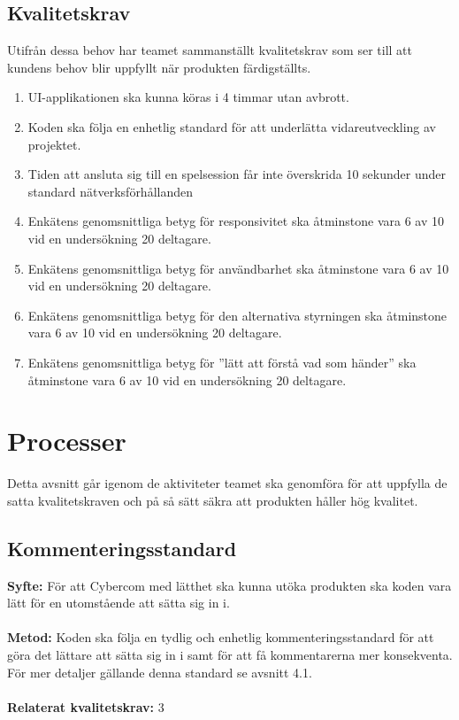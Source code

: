 \documentclass[10pt]{article}
\begin{document}
	\subsection{Kvalitetskrav}
	Utifrån dessa behov har teamet sammanställt kvalitetskrav som ser till att kundens behov blir uppfyllt när produkten färdigställts.
	\begin{enumerate}
		\item UI-applikationen ska kunna köras i 4 timmar utan avbrott.
		\item Koden ska följa en enhetlig standard för att underlätta vidareutveckling av projektet.
		\item Tiden att ansluta sig till en spelsession får inte överskrida 10 sekunder under standard nätverksförhållanden
		\item Enkätens genomsnittliga betyg för responsivitet ska åtminstone vara 6 av 10 vid en undersökning 20 deltagare.
		\item Enkätens genomsnittliga betyg för användbarhet ska åtminstone vara 6 av 10 vid en undersökning 20 deltagare.
		\item Enkätens genomsnittliga betyg för den alternativa styrningen ska åtminstone vara 6 av 10 vid en undersökning 20 deltagare.
		\item Enkätens genomsnittliga betyg för ''lätt att förstå vad som händer'' ska åtminstone vara 6 av 10 vid en undersökning 20 deltagare.
		
	\end{enumerate}

\pagebreak
\section{Processer}
	Detta avsnitt går igenom de aktiviteter teamet ska genomföra för att uppfylla de satta kvalitetskraven och på så sätt säkra att produkten håller hög kvalitet.
	\subsection{Kommenteringsstandard}
	\textbf{Syfte:} För att Cybercom med lätthet ska kunna utöka produkten ska koden vara lätt för en utomstående att sätta sig in i.
	\\\\
	\textbf{Metod:} Koden ska följa en tydlig och enhetlig kommenteringsstandard för att göra det lättare att sätta sig in i samt för att få kommentarerna mer konsekventa. För mer detaljer gällande denna standard se avsnitt 4.1.
	\\\\
	\textbf{Relaterat kvalitetskrav:} 3
	\\
\end{document}
